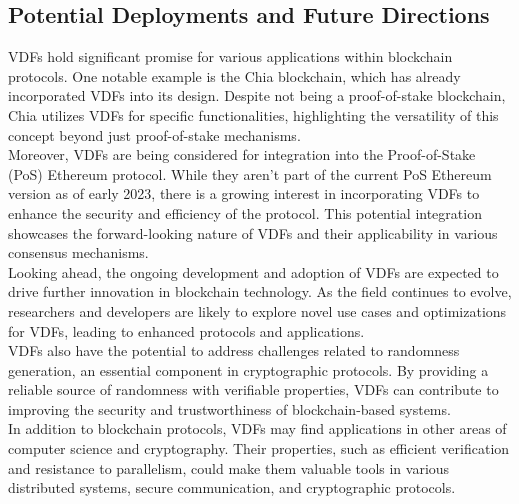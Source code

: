 \subsection{Potential Deployments and Future Directions}
VDFs hold significant promise for various applications within blockchain protocols. One notable example is the Chia blockchain, which has already incorporated VDFs into its design. Despite not being a proof-of-stake blockchain, Chia utilizes VDFs for specific functionalities, highlighting the versatility of this concept beyond just proof-of-stake mechanisms.\\
Moreover, VDFs are being considered for integration into the Proof-of-Stake (PoS) Ethereum protocol. While they aren't part of the current PoS Ethereum version as of early 2023, there is a growing interest in incorporating VDFs to enhance the security and efficiency of the protocol. This potential integration showcases the forward-looking nature of VDFs and their applicability in various consensus mechanisms.\\
Looking ahead, the ongoing development and adoption of VDFs are expected to drive further innovation in blockchain technology. As the field continues to evolve, researchers and developers are likely to explore novel use cases and optimizations for VDFs, leading to enhanced protocols and applications.\\
VDFs also have the potential to address challenges related to randomness generation, an essential component in cryptographic protocols. By providing a reliable source of randomness with verifiable properties, VDFs can contribute to improving the security and trustworthiness of blockchain-based systems.\\
In addition to blockchain protocols, VDFs may find applications in other areas of computer science and cryptography. Their properties, such as efficient verification and resistance to parallelism, could make them valuable tools in various distributed systems, secure communication, and cryptographic protocols.

